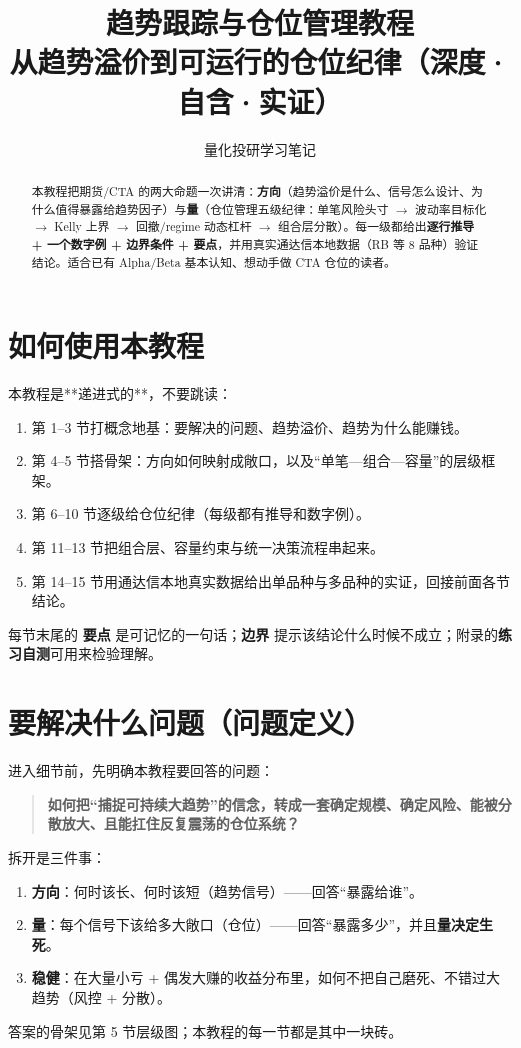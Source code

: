 \documentclass[UTF8,11pt]{ctexart}
\title{\bfseries 趋势跟踪与仓位管理教程\\[3pt]\large 从趋势溢价到可运行的仓位纪律（深度·自含·实证）}
\author{量化投研学习笔记}
\date{}
\begin{document}
\maketitle

\begin{abstract}
本教程把期货/CTA 的两大命题一次讲清：\textbf{方向}（趋势溢价是什么、信号怎么设计、为什么值得暴露给趋势因子）与\textbf{量}（仓位管理五级纪律：单笔风险头寸 $\to$ 波动率目标化 $\to$ Kelly 上界 $\to$ 回撤/regime 动态杠杆 $\to$ 组合层分散）。每一级都给出\textbf{逐行推导 + 一个数字例 + 边界条件 + 要点}，并用真实通达信本地数据（RB 等 8 品种）验证结论。适合已有 Alpha/Beta 基本认知、想动手做 CTA 仓位的读者。
\end{abstract}

\tableofcontents
\newpage

\section*{如何使用本教程}
本教程是**递进式的**，不要跳读：
\begin{enumerate}[itemsep=2pt]
\item 第 1--3 节打概念地基：要解决的问题、趋势溢价、趋势为什么能赚钱。
\item 第 4--5 节搭骨架：方向如何映射成敞口，以及“单笔—组合—容量”的层级框架。
\item 第 6--10 节逐级给仓位纪律（每级都有推导和数字例）。
\item 第 11--13 节把组合层、容量约束与统一决策流程串起来。
\item 第 14--15 节用通达信本地真实数据给出单品种与多品种的实证，回接前面各节结论。
\end{enumerate}
每节末尾的 \textbf{要点} 是可记忆的一句话；\textbf{边界} 提示该结论什么时候不成立；附录的\textbf{练习自测}可用来检验理解。

\section{要解决什么问题（问题定义）}
进入细节前，先明确本教程要回答的问题：
\begin{quote}
\textbf{如何把“捕捉可持续大趋势”的信念，转成一套确定规模、确定风险、能被分散放大、且能扛住反复震荡的仓位系统？}
\end{quote}
拆开是三件事：
\begin{enumerate}[itemsep=2pt]
\item \textbf{方向}：何时该长、何时该短（趋势信号）——回答“暴露给谁”。
\item \textbf{量}：每个信号下该给多大敞口（仓位）——回答“暴露多少”，并且\textbf{量决定生死}。
\item \textbf{稳健}：在大量小亏 + 偶发大赚的收益分布里，如何不把自己磨死、不错过大趋势（风控 + 分散）。
\end{enumerate}
答案的骨架见第 5 节层级图；本教程的每一节都是其中一块砖。
\end{document}
